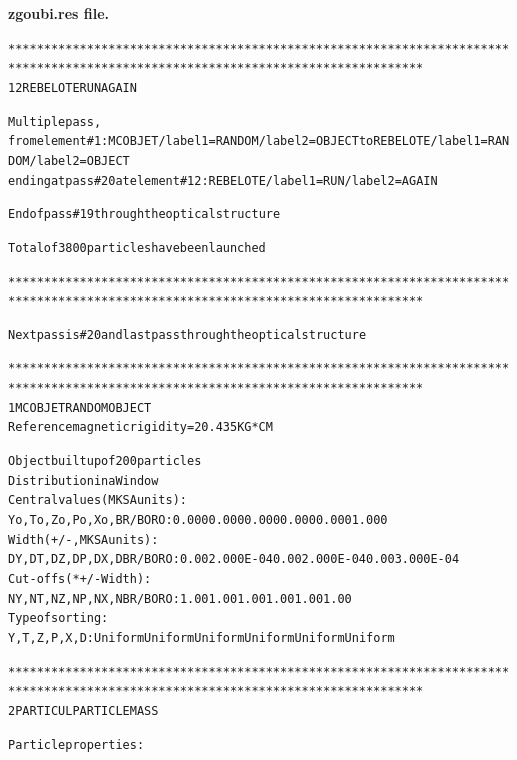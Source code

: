 \begin{tiny}
\noindent \textbf{\normalsize zgoubi.res  file.}

\begin{center}
\begin{alltt}

********************************************************************************************************************************
     12  REBELOTE    RUN         AGAIN     

     Multiple pass, 
          from element #     1 : MCOBJET   /label1=RANDOM    /label2=OBJECT     to REBELOTE /label1=RANDOM    /label2=OBJECT    
          ending at pass #      20 at element #    12 : REBELOTE  /label1=RUN       /label2=AGAIN     

     End of pass #       19 through the optical structure 

                     Total of       3800 particles have been launched

********************************************************************************************************************************

      Next  pass  is  #    20 and  last  pass  through  the  optical  structure

********************************************************************************************************************************
      1  MCOBJET     RANDOM      OBJECT    
                          Reference  magnetic rigidity =         20.435 KG*CM

                          Object  built  up  of     200  particles
                Distribution in a Window  
                Central values (MKSA units): 
            Yo, To, Zo, Po, Xo, BR/BORO  :          0.000       0.000       0.000       0.000       0.000       1.000    
                Width  (  +/- , MKSA units ) :
            DY, DT, DZ, DP, DX, DBR/BORO :           0.00       2.000E-04    0.00       2.000E-04    0.00       3.000E-04
                Cut-offs  ( * +/-Width ) :
            NY, NT, NZ, NP, NX, NBR/BORO :               1.00        1.00        1.00        1.00        1.00        1.00
                Type  of  sorting :
            Y, T, Z, P, X, D :                      Uniform     Uniform     Uniform     Uniform     Uniform     Uniform  

********************************************************************************************************************************
      2  PARTICUL  PARTICLE  MASS    

     Particle  properties :


\end{alltt}
\end{center}
\end{tiny}
